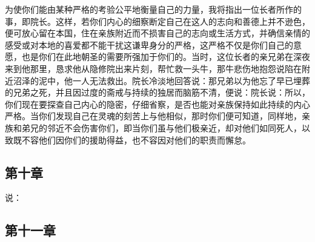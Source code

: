 为使你们能由某种严格的考验公平地衡量自己的力量，我将指出一位长者所作的事，即院长。这样，若你们内心的细察断定自己在这人的志向和善德上并不逊色，便可放心留在本国，住在亲族附近而不损害自己的志向或生活方式，并确信亲情的感受或对本地的喜爱都不能干扰这谦卑身分的严格，这严格不仅是你们自己的意愿，也是你们在此地朝圣的需要所强加于你们的。当时，这位长者的亲兄弟在深夜来到他那里，恳求他从隐修院出来片刻，帮忙救一头牛，那牛悲伤地抱怨说陷在附近沼泽的泥中，他一人无法救出。院长冷淡地回答说：那兄弟以为他忘了早已埋葬的兄弟之死，并且因过度的斋戒与持续的独居而脑筋不清，便说：院长说：所以，你们现在要探查自己内心的隐密，仔细省察，是否也能对亲族保持如此持续的内心严格。当你们发现自己在灵魂的刻苦上与他相似，那时你们便可知道，同样地，亲族和弟兄的邻近不会伤害你们，即当你们虽与他们极亲近，却对他们如同死人，以致既不容他们因你们的援助得益，也不容因对他们的职责而懈怠。\par


\subsection{第十章}

\par

说：\newline{}\par


\subsection{第十一章}

